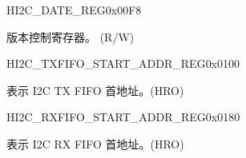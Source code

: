 \begin{register}{H}{I2C\_DATE\_REG}{0x00F8}\label{regdesc:I2CDATEREG}
%
\regnewline%
\begin{regdesc}\begin{reglist}
\label{fielddesc:I2CDATE}\item [I2C\_DATE] 版本控制寄存器。 (R/W)
\end{reglist}\end{regdesc}
\end{register}


\begin{register}{H}{I2C\_TXFIFO\_START\_ADDR\_REG}{0x0100}\label{regdesc:I2CTXFIFOSTARTADDRREG}
%
\regnewline%
\begin{regdesc}\begin{reglist}
\label{fielddesc:I2CTXFIFOSTARTADDR}\item [I2C\_TXFIFO\_START\_ADDR] 表示 I2C TX FIFO 首地址。(HRO)
\end{reglist}\end{regdesc}
\end{register}


\begin{register}{H}{I2C\_RXFIFO\_START\_ADDR\_REG}{0x0180}\label{regdesc:I2CRXFIFOSTARTADDRREG}
%
\regnewline%
\begin{regdesc}\begin{reglist}
\label{fielddesc:I2CRXFIFOSTARTADDR}\item [I2C\_RXFIFO\_START\_ADDR] 表示 I2C RX FIFO 首地址。(HRO)
\end{reglist}\end{regdesc}
\end{register}
